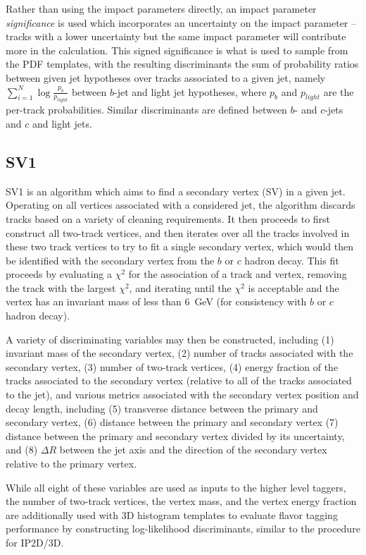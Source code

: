 Rather than using the impact parameters directly, an impact parameter \emph{significance} is used which 
incorporates an uncertainty on the impact parameter -- tracks with a lower uncertainty but the same impact 
parameter will contribute more in the calculation. This signed significance is what is used to sample from the 
PDF templates, with the resulting discriminants the sum of probability ratios between given jet hypotheses over 
tracks associated to a given jet, namely $\sum_{i=1}^{N} \log{\frac{p_{b}}{p_{light}}}$ between $b$-jet and 
light jet hypotheses, where $p_{b}$ and $p_{light}$ are the per-track probabilities. Similar discriminants 
are defined between $b$- and $c$-jets and $c$ and light jets.

\subsection{SV1}
SV1 is an algorithm which aims to find a secondary vertex (SV) in a given jet. Operating on all 
vertices associated with a considered jet, the algorithm discards tracks based on a variety of cleaning 
requirements. It then proceeds to first construct all two-track vertices, and then iterates over all the 
tracks involved in these two track vertices to try to fit a single secondary vertex, which would then be 
identified with the secondary vertex from the $b$ or $c$ hadron decay. This fit proceeds by evaluating 
a $\chi^2$ for the association of a track and vertex, removing the track with the largest $\chi^2$, 
and iterating until the $\chi^2$ is acceptable and the vertex has an invariant mass of less than 
\SI{6}{\GeV} (for consistency with $b$ or $c$ hadron decay).

A variety of discriminating variables may then be constructed, including (1) invariant mass of the secondary 
vertex, (2) number of tracks associated with the secondary vertex, (3) number of two-track vertices, 
(4) energy fraction of the tracks associated to the secondary vertex (relative to all of the tracks 
associated to the jet), and various metrics associated with the secondary vertex position and decay length, 
including (5) transverse distance between the primary and secondary vertex, (6) distance between the primary 
and secondary vertex (7) distance between the primary and secondary vertex divided by its uncertainty, 
and (8) $\Delta R$ between the jet axis and the direction of the secondary vertex relative to the primary
vertex.

While all eight of these variables are used as inputs to the higher level taggers, the number of two-track vertices, 
the vertex mass, and the vertex energy fraction are additionally used with 3D histogram templates to evaluate 
flavor tagging performance by constructing log-likelihood discriminants, similar to the procedure for 
IP2D/3D.

